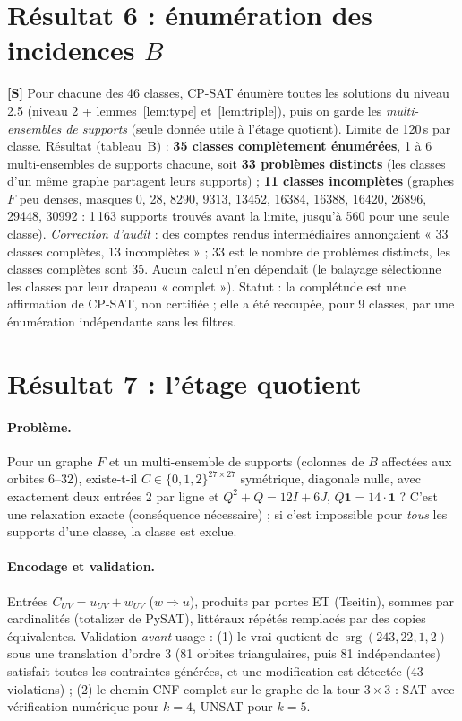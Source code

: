 \documentclass[11pt,a4paper]{article}
\theoremstyle{remark}
\newcommand{\srg}{\operatorname{srg}}
\newcommand{\st}[1]{\textbf{[#1]}}
\begin{document}
\section{Résultat 6 : énumération des incidences $B$}\label{sec:enum}
\st{S} Pour chacune des 46 classes, CP-SAT énumère toutes les solutions du niveau 2.5 (niveau 2 + lemmes~\ref{lem:type} et~\ref{lem:triple}), puis on garde
les \emph{multi-ensembles de supports} (seule donnée utile à l'étage quotient). Limite de 120\,s par classe. Résultat (tableau~B) :
\textbf{35 classes complètement énumérées}, 1 à 6 multi-ensembles de supports chacune, soit \textbf{33 problèmes distincts} (les classes d'un même graphe
partagent leurs supports) ; \textbf{11 classes incomplètes} (graphes $F$ peu denses, masques 0, 28, 8290, 9313, 13452, 16384, 16388, 16420, 26896, 29448,
30992 : 1\,163 supports trouvés avant la limite, jusqu'à 560 pour une seule classe).
\emph{Correction d'audit} : des comptes rendus intermédiaires annonçaient « 33 classes complètes, 13 incomplètes » ; 33 est le nombre de problèmes distincts,
les classes complètes sont 35. Aucun calcul n'en dépendait (le balayage sélectionne les classes par leur drapeau « complet »).
Statut : la complétude est une affirmation de CP-SAT, non certifiée ; elle a été recoupée, pour 9 classes, par une énumération indépendante sans les filtres.

\section{Résultat 7 : l'étage quotient}\label{sec:stageq}
\paragraph{Problème.} Pour un graphe $F$ et un multi-ensemble de supports (colonnes de $B$ affectées aux orbites 6--32), existe-t-il
$C\in\{0,1,2\}^{27\times27}$ symétrique, diagonale nulle, avec exactement deux entrées $2$ par ligne et $Q^2+Q=12I+6J$, $Q\mathbf 1=14\cdot\mathbf1$ ?
C'est une relaxation exacte (conséquence nécessaire) ; si c'est impossible pour \emph{tous} les supports d'une classe, la classe est exclue.

\paragraph{Encodage et validation.} Entrées $C_{UV}=u_{UV}+w_{UV}$ ($w\Rightarrow u$), produits par portes ET (Tseitin), sommes par cardinalités (totalizer de
PySAT), littéraux répétés remplacés par des copies équivalentes. Validation \emph{avant} usage : (1) le vrai quotient de $\srg(243,22,1,2)$ sous une
translation d'ordre 3 (81 orbites triangulaires, puis 81 indépendantes) satisfait toutes les contraintes générées, et une modification est détectée
(43 violations) ; (2) le chemin CNF complet sur le graphe de la tour $3\times3$ : SAT avec vérification numérique pour $k=4$, UNSAT pour $k=5$.
\end{document}
